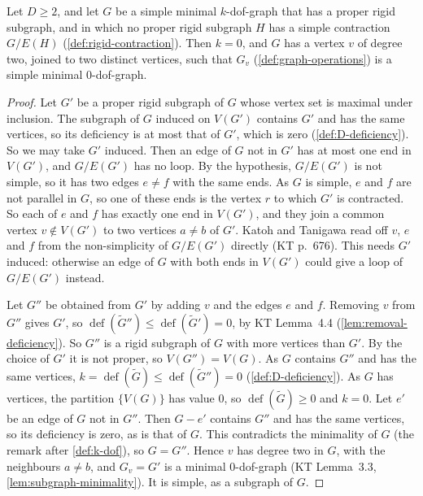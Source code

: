 \begin{lemma}
  \label{lem:claim-6-6}
  \leanok
  Let $D \ge 2$, and let $G$ be a simple minimal $k$-dof-graph that has
  a proper rigid subgraph, and in which no proper rigid subgraph $H$ has
  a simple contraction $G/E(H)$
  (\cref{def:rigid-contraction}). Then $k = 0$, and $G$ has a vertex $v$
  of degree two, joined to two distinct vertices, such that $G_v$
  (\cref{def:graph-operations}) is a simple minimal $0$-dof-graph.
\end{lemma}
\begin{proof}
  \leanok
  Let $G'$ be a proper rigid subgraph of $G$ whose vertex set is maximal
  under inclusion. The subgraph of $G$ induced on $V(G')$ contains $G'$ and
  has the same vertices, so its deficiency is at most that of $G'$,
  which is zero (\cref{def:D-deficiency}). So we may take $G'$ induced.
  Then an edge of $G$ not in $G'$ has at most one end in $V(G')$, and
  $G/E(G')$ has no loop. By the hypothesis, $G/E(G')$ is not simple, so
  it has two edges $e \neq f$ with the same ends. As $G$ is simple, $e$
  and $f$ are not parallel in $G$, so one of these ends is the vertex $r$
  to which $G'$ is contracted. So each of $e$ and $f$ has exactly one end
  in $V(G')$, and they join a common vertex $v \notin V(G')$ to two
  vertices $a \neq b$ of $G'$. Katoh and Tanigawa read off $v$, $e$ and
  $f$ from the non-simplicity of $G/E(G')$ directly (KT p.~676). This
  needs $G'$ induced: otherwise an edge of $G$ with both ends in $V(G')$
  could give a loop of $G/E(G')$ instead.

  Let $G''$ be obtained from $G'$ by adding $v$ and the edges $e$ and
  $f$. Removing $v$ from $G''$ gives $G'$, so
  $\operatorname{def}(\tilde G'') \le \operatorname{def}(\tilde G') = 0$,
  by KT Lemma~4.4 (\cref{lem:removal-deficiency}). So $G''$ is a rigid
  subgraph of $G$ with more vertices than $G'$. By the choice of $G'$ it
  is not proper, so $V(G'') = V(G)$. As $G$ contains $G''$ and has the
  same vertices,
  $k = \operatorname{def}(\tilde G) \le \operatorname{def}(\tilde G'') = 0$
  (\cref{def:D-deficiency}). As $G$ has vertices, the partition
  $\{V(G)\}$ has value $0$, so $\operatorname{def}(\tilde G) \ge 0$ and
  $k = 0$. Let $e'$ be an edge of $G$ not in
  $G''$. Then $G - e'$ contains $G''$ and has the same vertices, so its
  deficiency is zero, as is that of $G$. This contradicts the minimality
  of $G$ (the remark after \cref{def:k-dof}), so $G = G''$. Hence $v$
  has degree two in $G$, with the neighbours $a \neq b$, and $G_v = G'$
  is a minimal $0$-dof-graph (KT Lemma~3.3,
  \cref{lem:subgraph-minimality}). It is simple, as a subgraph of $G$.
\end{proof}

